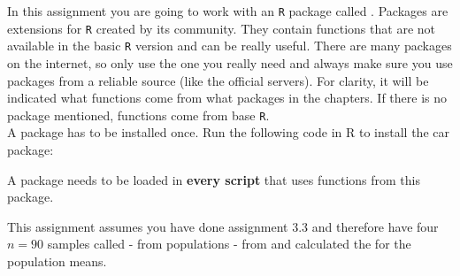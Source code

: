 \setcounter{section}{3}
\setcounter{subsection}{4}
\setcounter{question}{0}



In this assignment you are going to work with an \texttt{R} package called . Packages are extensions for \texttt{R} created by its community. They contain functions that are not available in the basic \texttt{R} version and can be really useful. There are many packages on the internet, so only use the one you really need and always make sure you use packages from a reliable source (like the official  servers). For clarity, it will be indicated what functions come from what packages in the chapters. If there is no package mentioned, functions come from base \texttt{R}. \\

A package has to be installed once. Run the following code in R to install the car package: \\


A package needs to be loaded in \textbf{every script} that uses functions from this package. \\


This assignment assumes you have done assignment 3.3 and therefore have four $n = 90$ samples called  -  from populations  -  from  and calculated the  for the population means. \\


\rcodeanswermedium


\threelineanswerbox

\clearpage %


